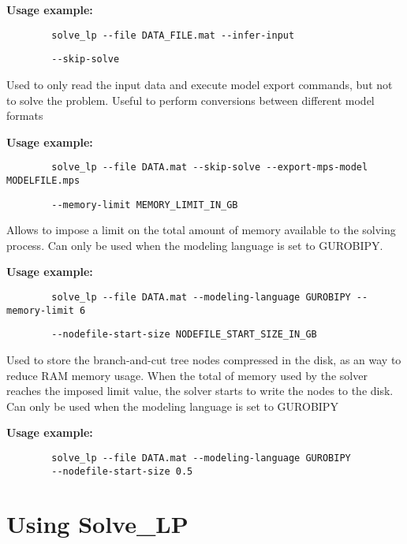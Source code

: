 \documentclass[12pt,hidelinks]{article}
\begin{document}
	\textbf{Usage example:} 
	\begin{verbatim}
		solve_lp --file DATA_FILE.mat --infer-input
	\end{verbatim}

	{\color{mordantred19}
	\begin{verbatim}
		--skip-solve
	\end{verbatim}
	} Used to only read the input data and execute model export commands, but not to solve the problem. Useful to perform conversions between different model formats

	\textbf{Usage example:} 
	\begin{verbatim}
		solve_lp --file DATA.mat --skip-solve --export-mps-model MODELFILE.mps
	\end{verbatim}

	{\color{mordantred19}
	\begin{verbatim}
		--memory-limit MEMORY_LIMIT_IN_GB
	\end{verbatim}
	} Allows to impose a limit on the total amount of memory available to the solving process. Can only be used when the modeling language is set to GUROBIPY.

	\textbf{Usage example:} 
	\begin{verbatim}
		solve_lp --file DATA.mat --modeling-language GUROBIPY --memory-limit 6
	\end{verbatim}

	{\color{mordantred19}
	\begin{verbatim}
		--nodefile-start-size NODEFILE_START_SIZE_IN_GB
	\end{verbatim}
	} Used to store the branch-and-cut tree nodes compressed in the disk, as an way to reduce RAM memory usage. When the total of memory used by the solver reaches the imposed limit value, the solver starts to write the nodes to the disk. Can only be used when the modeling language is set to GUROBIPY

	\textbf{Usage example:} 
	\begin{verbatim}
		solve_lp --file DATA.mat --modeling-language GUROBIPY
		--nodefile-start-size 0.5
	\end{verbatim}

\newpage

\section{Using Solve\_LP}
\label{section:usage}
\vspace{10.5cm}
\end{document}
